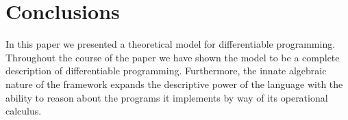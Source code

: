\section{Conclusions}

In this paper we presented a theoretical model for differentiable programming. Throughout the course of the paper we have shown the model to be a complete description of differentiable programming.
Furthermore, the innate algebraic nature of the framework expands the descriptive power of the language with the ability to reason about the programs it implements by way of its operational calculus.
